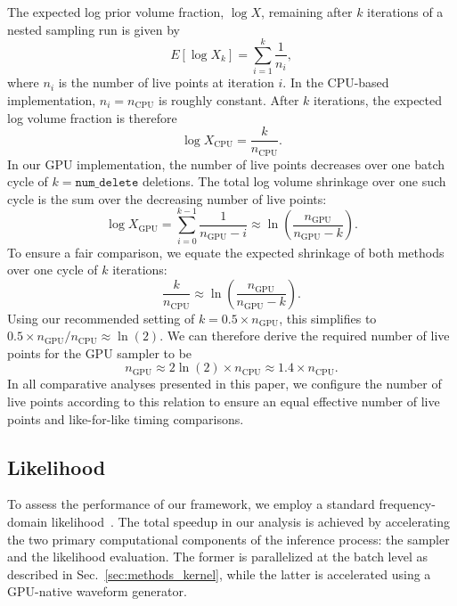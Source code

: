 \documentclass[fleqn,usenatbib]{mnras}
\begin{document}
The expected log prior volume fraction, $\log X$, remaining after $k$ iterations
of a nested sampling run is given by~\citep{skilling, dynamic_ns, aeons}
\begin{equation}
    E[\log X_k] = \sum_{i=1}^{k} \frac{1}{n_i},
\end{equation}
where $n_i$ is the number of live points at iteration $i$. In the
CPU-based implementation, $n_i = n_{\text{CPU}}$ is roughly constant.
After $k$ iterations, the expected log volume fraction is therefore
\begin{equation}
    \log X_{\text{CPU}} = \frac{k}{n_{\text{CPU}}}.
\end{equation}
In our GPU implementation, the number of live points decreases over one
batch cycle of $k = \texttt{num\_delete}$ deletions. The total log
volume shrinkage over one such cycle is the sum over the decreasing
number of live points:
\begin{equation}
    \log X_{\text{GPU}} = \sum_{i=0}^{k-1} \frac{1}{n_{\text{GPU}}-i} \approx \ln\left(\frac{n_{\text{GPU}}}{n_{\text{GPU}}-k}\right).
\end{equation}
To ensure a fair comparison, we equate the expected shrinkage of both
methods over one cycle of $k$ iterations:
\begin{equation}
    \frac{k}{n_{\text{CPU}}} \approx \ln\left(\frac{n_{\text{GPU}}}{n_{\text{GPU}}-k}\right).
\end{equation}
Using our recommended setting of $k = 0.5 \times n_{\text{GPU}}$, this
simplifies to $0.5 \times n_{\text{GPU}} / n_{\text{CPU}} \approx \ln(2)$.
We can therefore derive the required number of live points for the GPU
sampler to be
\begin{equation}
    n_{\text{GPU}} \approx 2 \ln(2) \times n_{\text{CPU}} \approx 1.4 \times n_{\text{CPU}}.
\end{equation}
In all comparative analyses presented in this paper, we configure the
number of live points according to this relation to ensure an equal 
effective number of live points and
like-for-like timing comparisons.


\subsection{Likelihood}

To assess the performance of our framework, we employ a standard
frequency-domain likelihood~\citep{lal, NelsonMeyerReview}. The total
speedup in our analysis is achieved by accelerating the two primary
computational components of the inference process: the sampler and the
likelihood evaluation. The former is parallelized at the batch level as
described in Sec.~\ref{sec:methods_kernel}, while the latter is
accelerated using a GPU-native waveform generator.
\end{document}
